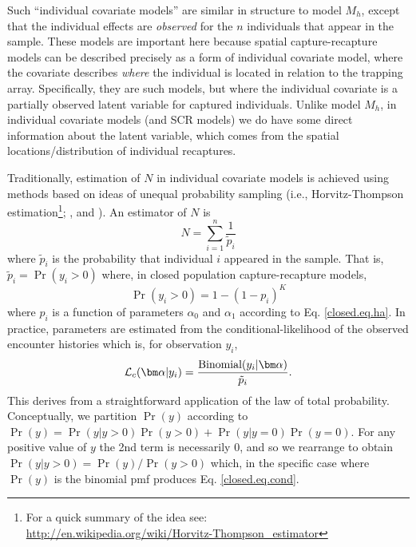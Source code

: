 Such ``individual covariate models'' are similar in structure to model
$M_{h}$, except that the individual effects are {\it observed} for the
$n$ individuals that appear in the sample. These models are important
here because spatial capture-recapture models can be described
precisely as a form of individual covariate model, where the covariate
describes {\it where} the individual is located in relation to the
trapping array.  Specifically, they are such models, but where the
individual covariate is a partially observed latent variable for
captured individuals.  Unlike model $M_h$, in individual covariate
models (and SCR models) we do have some direct information about the
latent variable, which comes from the spatial locations/distribution
of individual recaptures.

Traditionally, estimation of $N$ in individual covariate models is
achieved using methods based on ideas of unequal probability sampling
(i.e., Horvitz-Thompson estimation\footnote{For a  quick summary of
  the idea see: \\
  \url{http://en.wikipedia.org/wiki/Horvitz-Thompson_estimator}};
\citet{huggins:1989},
\citet{alho:1990} and \citet{borchers_etal:2002}). An estimator of $N$ is
\[
\hat{N} = \sum_{i=1}^{n} \frac{1}{\tilde{p}_{i}}
\]
where $\tilde{p}_{i}$ is the probability that individual $i$ appeared
in the sample.  That is, $\tilde{p}_{i} = \Pr(y_{i}>0)$
where, in closed population capture-recapture models,
\[
\Pr(y_{i}>0) = 1- (1-p_{i})^K
\]
where $p_{i}$ is a function of parameters $\alpha_{0}$ and $\alpha_{1}$
according to Eq. \ref{closed.eq.ha}.  In practice, parameters are
estimated from the conditional-likelihood of the observed encounter
histories which is, for observation $y_{i}$,
\begin{equation}
{\cal L}_{c}( {\bm \alpha} | y_{i}) = \frac{ \mbox{Binomial}(y_{i}|{\bm \alpha}) } { \tilde{p}_{i}}.
\label{closed.eq.cond}
\end{equation}
This derives from a straightforward application of the law of total
probability. Conceptually, we partition $\Pr(y)$ according to 
$\Pr(y) = \Pr(y|y>0)\Pr(y>0) + \Pr(y|y=0)\Pr(y=0)$. For any positive
value of $y$ the 2nd term is necessarily 0, and so we rearrange to
obtain
$\Pr(y|y>0) = \Pr(y)/\Pr(y>0)$ which, in the specific case where
$\Pr(y)$ is the 
binomial pmf produces Eq. \ref{closed.eq.cond}.


